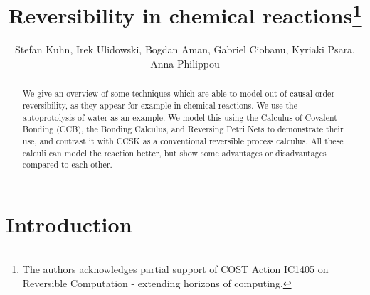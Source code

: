 \documentclass[runningheads]{llncs}
\begin{document}
%
\title{Reversibility in chemical reactions\thanks{The authors acknowledges partial support of COST Action IC1405 on Reversible Computation - extending horizons of computing.}}
%
%
\author{Stefan Kuhn, Irek Ulidowski, Bogdan Aman, Gabriel Ciobanu, Kyriaki Psara, Anna Philippou}
%
%
%
\maketitle              %
%
\begin{abstract}
We give an overview of some techniques which are able to model out-of-causal-order reversibility, as they appear for example in chemical reactions. We use the autoprotolysis of water as an example. We model this using the Calculus of Covalent Bonding (CCB), the Bonding Calculus, and Reversing Petri Nets to demonstrate their use, and contrast it with CCSK as a conventional reversible process calculus. All these calculi can model the reaction better, but show some advantages or disadvantages compared to each other.  

\end{abstract}
%
%
%
\section{Introduction}
\end{document}
